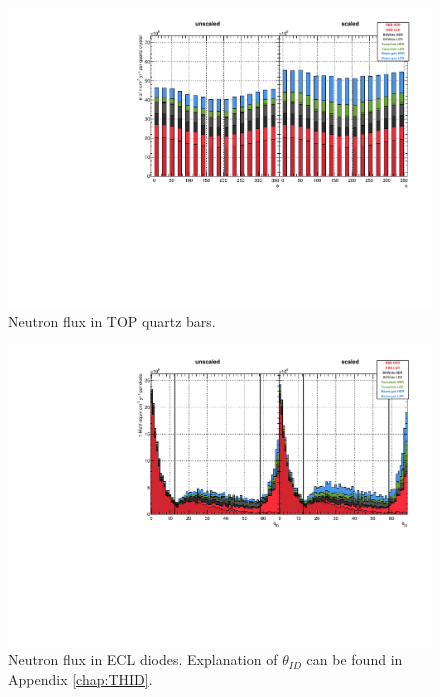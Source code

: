 \begin{figure}[htb]
	\centerfloat
		\includegraphics[width=\textwidth]{images/hTOPFluxBar}
	\caption{Neutron flux in TOP quartz bars.}	
	\label{fig:TOPBARFlux}
\end{figure}

\begin{figure}[htb]
	\centerfloat
		\includegraphics[width=\textwidth]{images/hECLFluxTID}
	\caption[Neutron flux in ECL diodes]{Neutron flux in ECL diodes. Explanation of $\theta_{ID}$ can be found in Appendix \ref{chap:THID}.}	
	\label{fig:ECLFlux}
\end{figure}

